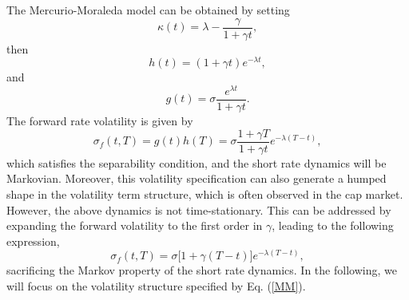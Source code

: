 \documentclass[12pt]{article}
\begin{document}
  The Mercurio-Moraleda model \cite{BM} can be obtained by setting
  \begin{equation}
    \kappa(t)=\lambda-\frac{\gamma}{1+\gamma t},
  \end{equation}
  then
  \begin{equation}
    h(t)=\left(1+\gamma t\right)e^{-\lambda t},
  \end{equation}
  and
  \begin{equation}
    g(t)=\sigma\frac{e^{\lambda t}}{1+\gamma t}.
  \end{equation}
  The forward rate volatility is given by
  \begin{equation}
    \sigma_f(t,T)=g(t)h(T)=\sigma\frac{1+\gamma T}{1+\gamma t}e^{-\lambda(T-t)},
    \label{MM}
  \end{equation}
  which satisfies the separability condition, and the short rate dynamics will be Markovian. Moreover, this volatility specification can also generate
  a humped shape in the volatility term structure, which is often observed in the cap market. However, the above dynamics is not time-stationary.
  This can be addressed by expanding the forward volatility to the first order in $\gamma$, leading to the following expression,
  \begin{equation}
    \sigma_f(t,T)=\sigma\Big[1+\gamma(T-t)\Big]e^{-\lambda(T-t)},
  \end{equation}
  sacrificing the Markov property of the short rate dynamics. In the following, we will focus on the volatility structure specified by Eq. (\ref{MM}).
\end{document}
